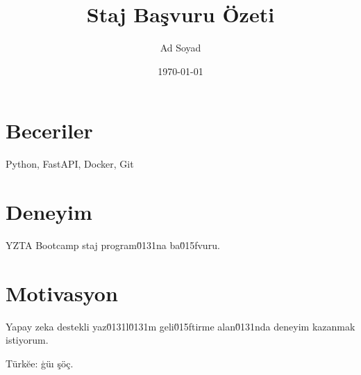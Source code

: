 \documentclass[11pt,a4paper]{article}
\title{Staj Ba\c{s}vuru \"{O}zeti}
\author{Ad Soyad}
\date{\today}
\begin{document}
\maketitle

\section{Beceriler}
Python, FastAPI, Docker, Git

\section{Deneyim}
YZTA Bootcamp staj program\u0131na ba\u015fvuru.

\section{Motivasyon}
Yapay zeka destekli yaz\u0131l\u0131m geli\u015ftirme alan\u0131nda deneyim kazanmak istiyorum.

T\"{u}rk\u{e}e: \c{g}\"{u}\i{} \c{s}\"{o}\c{c}.
\end{document}
